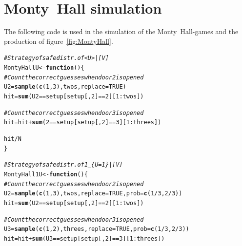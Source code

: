 \documentclass[twoside,a4paper]{article}
\makeatletter
\theoremstyle{plain}
\theoremstyle{definition}
\theoremstyle{remark}
\numberwithin{equation}{section}
\newcommand{\hlnum}[1]{\textcolor[rgb]{0.686,0.059,0.569}{#1}}%
\newcommand{\hlcom}[1]{\textcolor[rgb]{0.678,0.584,0.686}{\textit{#1}}}%
\newcommand{\hlopt}[1]{\textcolor[rgb]{0,0,0}{#1}}%
\newcommand{\hlstd}[1]{\textcolor[rgb]{0.345,0.345,0.345}{#1}}%
\newcommand{\hlkwa}[1]{\textcolor[rgb]{0.161,0.373,0.58}{\textbf{#1}}}%
\newcommand{\hlkwb}[1]{\textcolor[rgb]{0.69,0.353,0.396}{#1}}%
\newcommand{\hlkwc}[1]{\textcolor[rgb]{0.333,0.667,0.333}{#1}}%
\newcommand{\hlkwd}[1]{\textcolor[rgb]{0.737,0.353,0.396}{\textbf{#1}}}%
\newenvironment{kframe}{%
 \def\at@end@of@kframe{}%
 \ifinner\ifhmode%
  \def\at@end@of@kframe{\end{minipage}}%
  \begin{minipage}{\columnwidth}%
 \fi\fi%
 \def\FrameCommand##1{\hskip\@totalleftmargin \hskip-\fboxsep
 \colorbox{shadecolor}{##1}\hskip-\fboxsep
     \hskip-\linewidth \hskip-\@totalleftmargin \hskip\columnwidth}%
 \MakeFramed {\advance\hsize-\width
   \@totalleftmargin\z@ \linewidth\hsize
   \@setminipage}}%
 {\par\unskip\endMakeFramed%
 \at@end@of@kframe}
\newenvironment{knitrout}{}{} %
\DeclareMathOperator{\1}{\mathbbm{1}}
\makeatother
\begin{document}
\section{Monty~Hall simulation}\label{app:MontyHallSim}
The following code is used in the simulation of the Monty~Hall-games and the production of figure~\ref{fig:MontyHall}.
\begin{knitrout}
\color{fgcolor}\begin{kframe}
\begin{alltt}
\hlcom{# Strategy of safe distr. of <U>|[V]}
\hlstd{MontyHallU} \hlkwb{<-} \hlkwa{function} \hlstd{() \{}
  \hlcom{# Count the correct guesses when door 2 is opened}
  \hlstd{U2} \hlkwb{=} \hlkwd{sample}\hlstd{(}\hlkwd{c}\hlstd{(}\hlnum{1}\hlstd{,}\hlnum{3}\hlstd{), twos,} \hlkwc{replace} \hlstd{=} \hlnum{TRUE}\hlstd{)}
  \hlstd{hit} \hlkwb{=} \hlkwd{sum}\hlstd{(U2} \hlopt{==} \hlstd{setup[setup[,}\hlnum{2}\hlstd{]} \hlopt{==} \hlnum{2}\hlstd{][}\hlnum{1}\hlopt{:}\hlstd{twos])}

  \hlcom{# Count the correct guesses when door 3 is opened}
  \hlstd{hit} \hlkwb{=} \hlstd{hit} \hlopt{+} \hlkwd{sum}\hlstd{(}\hlnum{2} \hlopt{==} \hlstd{setup[setup[,}\hlnum{2}\hlstd{]} \hlopt{==} \hlnum{3}\hlstd{][}\hlnum{1}\hlopt{:}\hlstd{threes])}

  \hlstd{hit}\hlopt{/}\hlstd{N}
\hlstd{\}}

\hlcom{# Strategy of safe distr. of 1_\{U=1\}|[V]}
\hlstd{MontyHall1U} \hlkwb{<-} \hlkwa{function}\hlstd{() \{}
  \hlcom{# Count the correct guesses when door 2 is opened}
  \hlstd{U2} \hlkwb{=} \hlkwd{sample}\hlstd{(}\hlkwd{c}\hlstd{(}\hlnum{1}\hlstd{,}\hlnum{3}\hlstd{), twos,} \hlkwc{replace} \hlstd{=} \hlnum{TRUE}\hlstd{,} \hlkwc{prob} \hlstd{=} \hlkwd{c}\hlstd{(}\hlnum{1}\hlopt{/}\hlnum{3}\hlstd{,}\hlnum{2}\hlopt{/}\hlnum{3}\hlstd{))}
  \hlstd{hit} \hlkwb{=} \hlkwd{sum}\hlstd{(U2} \hlopt{==} \hlstd{setup[setup[,}\hlnum{2}\hlstd{]} \hlopt{==} \hlnum{2}\hlstd{][}\hlnum{1}\hlopt{:}\hlstd{twos])}

  \hlcom{# Count the correct guesses when door 3 is opened}
  \hlstd{U3} \hlkwb{=} \hlkwd{sample}\hlstd{(}\hlkwd{c}\hlstd{(}\hlnum{1}\hlstd{,}\hlnum{2}\hlstd{), threes,} \hlkwc{replace} \hlstd{=} \hlnum{TRUE}\hlstd{,} \hlkwc{prob} \hlstd{=} \hlkwd{c}\hlstd{(}\hlnum{1}\hlopt{/}\hlnum{3}\hlstd{,}\hlnum{2}\hlopt{/}\hlnum{3}\hlstd{))}
  \hlstd{hit} \hlkwb{=} \hlstd{hit} \hlopt{+} \hlkwd{sum}\hlstd{(U3} \hlopt{==} \hlstd{setup[setup[,}\hlnum{2}\hlstd{]} \hlopt{==} \hlnum{3}\hlstd{][}\hlnum{1}\hlopt{:}\hlstd{threes])}


\end{alltt}
\end{kframe}
\end{knitrout}
\end{document}
